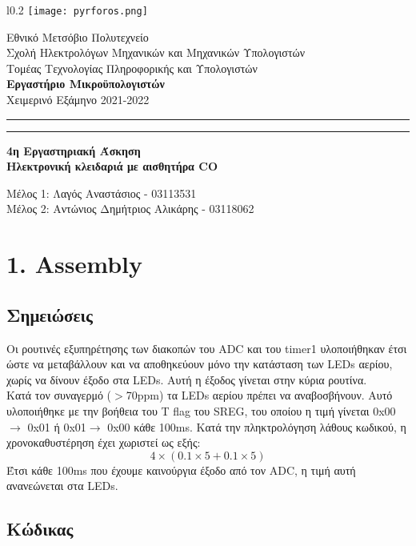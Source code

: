 \documentclass{article}
\begin{document}
\begin{wrapfigure}[5]{l}{0.2\textwidth}
\texttt{[image: pyrforos.png]}
\end{wrapfigure} 
\noindent
Εθνικό Μετσόβιο Πολυτεχνείο\\
Σχολή Ηλεκτρολόγων Μηχανικών και Μηχανικών Υπολογιστών\\
Τομέας Τεχνολογίας Πληροφορικής και Υπολογιστών\\
\textbf{Εργαστήριο Μικροϋπολογιστών}\\
Χειμερινό Εξάμηνο 2021-2022\\
\vspace{2.5cm}
\vspace{-5em}
\hrule \vspace{.2em}
\hrule
\vspace{1cm}
\centering
{\Large \textbf{4η Εργαστηριακή Άσκηση}\\ \textbf{Ηλεκτρονική κλειδαριά με αισθητήρα CO}\\}
\vspace{0.2cm}
\raggedright
$~~~~$\\
Μέλος 1: Λαγός Αναστάσιος - 03113531\\
Μέλος 2: Αντώνιος Δημήτριος Αλικάρης - 03118062 \\

\section*{1. Assembly}

\subsection*{Σημειώσεις}
Οι ρουτινές εξυπηρέτησης των διακοπών του ADC και του timer1 υλοποιήθηκαν έτσι ώστε να μεταβάλλουν και να αποθηκεύουν μόνο την κατάσταση των LEDs αερίου, χωρίς να δίνουν έξοδο στα LEDs. Αυτή η έξοδος γίνεται στην κύρια ρουτίνα.\\
Κατά τον συναγερμό ($>$70ppm) τα LEDs αερίου πρέπει να αναβοσβήνουν. Αυτό υλοποιήθηκε με την βοήθεια του T flag του SREG, του οποίου η τιμή γίνεται 0x00$\rightarrow$ 0x01 ή 0x01$\rightarrow$ 0x00 κάθε 100ms.
Κατά την πληκτρολόγηση λάθους κωδικού, η χρονοκαθυστέρηση έχει χωριστεί ως εξής: $$4\times(0.1\times 5 + 0.1\times 5)$$ Έτσι κάθε 100ms που έχουμε καινούργια έξοδο από τον ADC, η τιμή αυτή ανανεώνεται στα LEDs.

\subsection*{Κώδικας}
\end{document}
